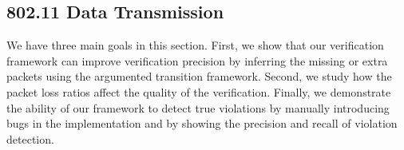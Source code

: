 \subsection{802.11 Data Transmission}
\label{subsec:tx}

%
We have three main goals in this section.  First, we show that our
verification framework can improve verification precision by inferring
the missing or extra packets using the argumented transition
framework.
%
Second, we study how the packet loss ratios affect the quality of the
verification.
%
Finally, we demonstrate the ability of our framework to detect true violations
by manually introducing bugs in the \ns{} implementation and by showing the
precision and recall of violation detection.


